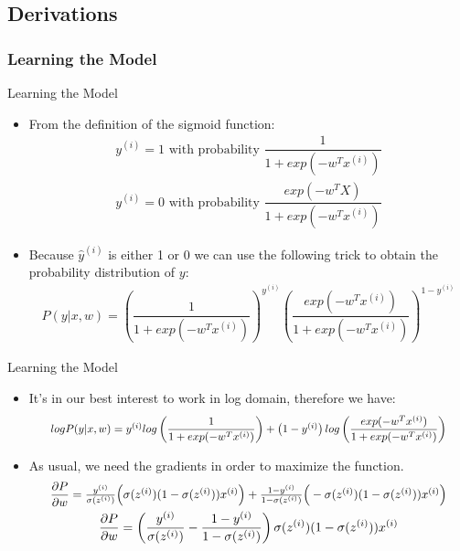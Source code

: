 \subsection{Derivations}
\subsubsection{Learning the Model}
\begin{frame}{Learning the Model}
\begin{itemize}
	\item From the definition of the sigmoid function:
	      \begin{gather*}
	      	y^{(i)} = 1 \text{ with probability } \dfrac{1}{1+exp(-w^Tx^{(i)})}\\
	      	y^{(i)} = 0 \text{ with probability } \dfrac{exp(-w^TX)}{1+exp(-w^Tx^{(i)})}
	      \end{gather*}
	\item Because $\hat{y}^{(i)}$ is either 1 or 0 we can use the following trick to obtain the probability distribution of $y$:
	      \begin{gather*}
	      	P(y|x,w) = \left(\dfrac{1}{1+exp(-w^Tx^{(i)})}\right)^{y^{(i)}}\left(\dfrac{exp(-w^Tx^{(i)})}{1+exp(-w^Tx^{(i)})}\right)^{1-y^{(i)}}
	      \end{gather*}
\end{itemize}
\end{frame}

\begin{frame}{Learning the Model}
\begin{itemize}
	\item It's in our best interest to work in log domain, therefore we have:
	      \begin{gather*}
	      	\resizebox{0.9\textwidth}{!}{$
	      		logP(y|x,w) = y^{(i)}log\left(\dfrac{1}{1+exp(-w^Tx^{(i)})}\right)+\left(1-y^{(i)}\right)log\left(\dfrac{exp(-w^Tx^{(i)})}{1+exp(-w^Tx^{(i)})}\right)$}
	      \end{gather*}
	\item As usual, we need the gradients in order to maximize the function.
	      \begin{gather*}
	      	\resizebox{0.9\textwidth}{!}{$\dfrac{\partial P}{\partial w} = \frac{y^{(i)}}{\sigma(z^{(i)})}\Big(\sigma(z^{(i)})(1-\sigma(z^{(i)}))x^{(i)}\Big) + \frac{1-y^{(i)}}{1-\sigma(z^{(i)})} \Big( -\sigma(z^{(i)})(1-\sigma(z^{(i)}))x^{(i)} \Big)$}\\
	      	\dfrac{\partial P}{\partial w} = \left(\frac{y^{(i)}}{\sigma(z^{(i)})} - \frac{1-y^{(i)}}{1-\sigma(z^{(i)})}\right) \sigma(z^{(i)})(1-\sigma(z^{(i)}))x^{(i)}
	      \end{gather*}
\end{itemize}
\end{frame}

